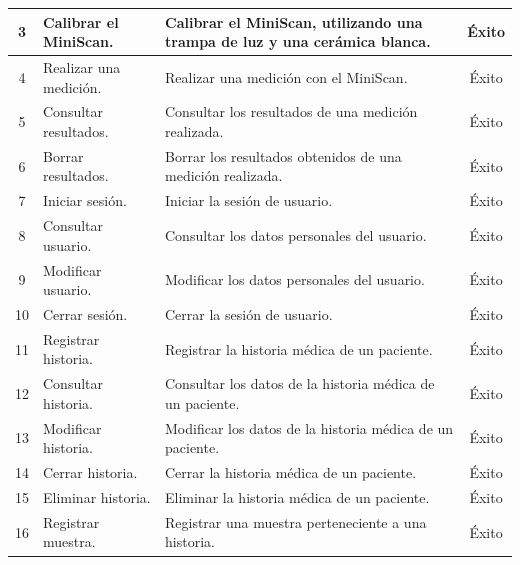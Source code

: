 {\begin{table}[h]
\begin{tabulary}{\anchotabla}{|c|L|J|c|}
			3 & Calibrar el \hbox{MiniScan}. & Calibrar el MiniScan, utilizando una trampa de luz y una cer\'{a}mica blanca. & \'{E}xito \\ \hline
			
			4 & Realizar una medici\'{o}n. & Realizar una medici\'{o}n con el MiniScan. & \'{E}xito \\ \hline
			
			5 & Consultar resultados. & Consultar los resultados de una medici\'{o}n realizada. & \'{E}xito \\ \hline
			
			6 & Borrar resultados. & Borrar los resultados obtenidos de una medici\'{o}n realizada. & \'{E}xito \\ \hline
			
			7 & Iniciar sesi\'{o}n. & Iniciar la sesi\'{o}n de usuario. & \'{E}xito \\ \hline
			
			8 & Consultar usuario. & Consultar los datos personales del usuario. & \'{E}xito \\ \hline
			
			9 & Modificar usuario. & Modificar los datos personales del usuario. & \'{E}xito \\ \hline
			
			10 & Cerrar sesi\'{o}n. & Cerrar la sesi\'{o}n de usuario. & \'{E}xito \\ \hline
			
			11 & Registrar historia. & Registrar la historia m\'{e}dica de un paciente. & \'{E}xito \\ \hline
			
			12 & Consultar historia. & Consultar los datos de la historia m\'{e}dica de un paciente. & \'{E}xito \\ \hline
			
			13 & Modificar historia. & Modificar los datos de la historia m\'{e}dica de un paciente. & \'{E}xito \\ \hline
			
			14 & Cerrar historia. & Cerrar la historia m\'{e}dica de un paciente. & \'{E}xito \\ \hline
			
			15 & Eliminar historia. & Eliminar la historia m\'{e}dica de un paciente. & \'{E}xito \\ \hline
			
			16 & Registrar muestra. & Registrar una muestra perteneciente a una historia. & \'{E}xito \\ \hline
			

\end{tabulary}
\end{table}}
